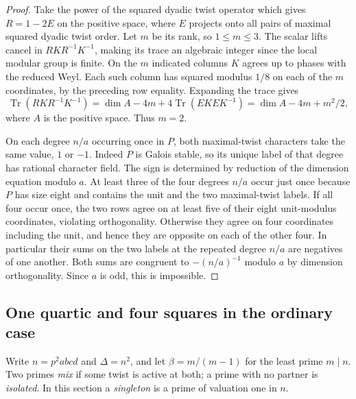 \documentclass[11pt,a4paper]{article}
\numberwithin{equation}{section}
\theoremstyle{remark}
\begin{document}
\begin{proof}
Take the power of the squared dyadic twist operator which gives
$R=1-2E$ on the positive space, where $E$ projects onto all
pairs of maximal squared dyadic twist order. Let $m$ be its
rank, so $1\le m\le3$. The scalar lifts cancel in
$RKR^{-1}K^{-1}$, making its trace an algebraic integer since the
local modular group is finite. On the $m$ indicated columns
$K$ agrees up to phases with the reduced Weyl. Each such column
has squared modulus $1/8$ on each of the $m$ coordinates, by
the preceding row equality. Expanding the trace gives
\[
 \operatorname{Tr}(RKR^{-1}K^{-1})
        =\dim A-4m+4\operatorname{Tr}(E K E K^{-1})
        =\dim A-4m+m^2/2 ,
\]
where $A$ is the positive space. Thus $m=2$.

On each degree $n/a$ occurring once in $P$, both maximal-twist
characters take the same value, $1$ or $-1$. Indeed $P$ is
Galois stable, so its unique label of that degree has rational
character field. The sign is determined by reduction of the
dimension equation modulo $a$. At least three of the four
degrees $n/a$ occur just once because $P$ has size eight and
contains the unit and the two maximal-twist labels. If all
four occur once, the two rows agree on at least five of their
eight unit-modulus coordinates, violating orthogonality.
Otherwise they agree on four coordinates including the unit,
and hence they are opposite on each of the other four.
In particular their sums on the two labels at the repeated
degree $n/a$ are negatives of one another. Both sums are
congruent to $-(n/a)^{-1}$ modulo $a$ by dimension
orthogonality. Since $a$ is odd, this is impossible.
\end{proof}

\subsection{One quartic and four squares in the ordinary case}\label{fam:F:sec:5}\label{fam:F:n:ordinary}
Write $n=p^2abcd$ and $\Delta=n^2$, and let $\beta=m/(m-1)$ for the least prime $m\mid n$. Two primes \emph{mix} if some twist is active at both; a prime with no partner is \emph{isolated}. In this section a \emph{singleton} is a prime of valuation one in $n$.
\end{document}
